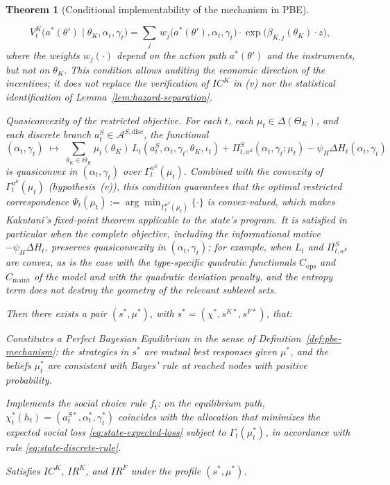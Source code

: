 \documentclass[ecta,nameyear,draft]{econsocart}
\theoremstyle{plain}
\newtheorem{theorem}{Theorem}
\theoremstyle{definition}
\newcommand{\ThetaK}{\Theta_K}
\newcommand{\1}{\mathbf{1}}
\begin{document}
\begin{theorem}[Conditional implementability of the mechanism in PBE]
\begin{list}{}
  \[
    V^K_t\!\bigl(a^\ast(\theta')\mid\theta_K,\alpha_t,\gamma_t\bigr)
    =
    \sum_{j}\,w_j\!\bigl(a^\ast(\theta'),\alpha_t,\gamma_t\bigr)
    \cdot\exp\!\bigl(\beta_{K,j}(\theta_K)\cdot z\bigr),
  \]
  where the weights $w_j(\cdot)$ depend on the action path $a^\ast(\theta')$ and the instruments, but not on $\theta_K$. This condition allows auditing the economic direction of the incentives; it does not replace the verification of $IC^K$ in \textup{(v)} nor the statistical identification of Lemma~\ref{lem:hazard-separation}.
  \item[\textup{(vii)}] Quasiconvexity of the restricted objective. For each $t$, each $\mu_t\in\Delta(\ThetaK)$, and each discrete branch $a_t^S\in\mathcal{A}^{S,\mathrm{disc}}$, the functional
  \[
  (\alpha_t,\gamma_t)\;\mapsto\;\sum_{\theta_K\in\ThetaK}\mu_t(\theta_K)\,L_t(a_t^S,\alpha_t,\gamma_t,\theta_K,\iota_t)
  +\Pi_{t,a^S}^S(\alpha_t,\gamma_t;\mu_t)
  -\psi_H\Delta H_t(\alpha_t,\gamma_t)
  \]
  is quasiconvex in $(\alpha_t,\gamma_t)$ over $\Gamma_t^{a^S}(\mu_t)$. Combined with the convexity of $\Gamma_t^{a^S}(\mu_t)$ \textup{(}hypothesis~\textup{(v)}\textup{)}, this condition guarantees that the optimal restricted correspondence $\Psi_t(\mu_t):=\arg\min_{\Gamma_t^{a^S}(\mu_t)}\{\cdot\}$ is convex-valued, which makes Kakutani's fixed-point theorem applicable to the state's program. It is satisfied in particular when the complete objective, including the informational motive $-\psi_H\Delta H_t$, preserves quasiconvexity in $(\alpha_t,\gamma_t)$; for example, when $L_t$ and $\Pi_{t,a^S}^S$ are convex, as is the case with the type-specific quadratic functionals $C_{\mathrm{ops}}$ and $C_{\mathrm{maint}}$ of the model and with the quadratic deviation penalty, and the entropy term does not destroy the geometry of the relevant sublevel sets.
\end{list}

Then there exists a pair $(s^\ast,\mu^\ast)$, with $s^\ast=({\chi}^\ast,s^{K\ast},s^{F\ast})$, that:
\begin{list}{}{\setlength{\labelwidth}{2.0em}\setlength{\labelsep}{0.7em}\setlength{\leftmargin}{2.7em}\setlength{\itemindent}{0pt}\setlength{\listparindent}{0pt}\setlength{\parsep}{0pt}\setlength{\itemsep}{0.25\baselineskip}}
    \item[\textup{(a)}] Constitutes a Perfect Bayesian Equilibrium in the sense of Definition~\ref{def:pbe-mechanism}: the strategies in $s^\ast$ are mutual best responses given $\mu^\ast$, and the beliefs $\mu_t^\ast$ are consistent with Bayes' rule at reached nodes with positive probability.
    \item[\textup{(b)}] Implements the social choice rule $f_t$: on the equilibrium path, $\chi_t^\ast(h_t)=(a_t^{S\ast},\alpha_t^\ast,\gamma_t^\ast)$ coincides with the allocation that minimizes the expected social loss \eqref{eq:state-expected-loss} subject to $\Gamma_t(\mu_t^\ast)$, in accordance with rule \eqref{eq:state-discrete-rule}.
    \item[\textup{(c)}] Satisfies $IC^K$, $IR^K$, and $IR^F$ under the profile $(s^\ast,\mu^\ast)$.
\end{list}
\end{theorem}
\end{document}
